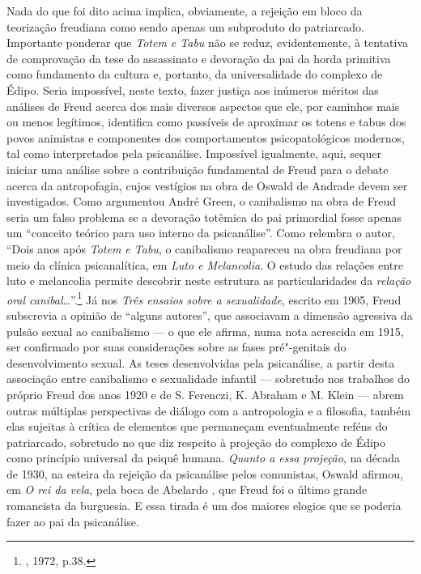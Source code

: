 Nada do que foi dito acima implica, obviamente, a rejeição em bloco da
teorização freudiana como sendo apenas um subproduto do patriarcado.
Importante ponderar que \emph{Totem e Tabu} não se reduz, evidentemente,
à tentativa de comprovação da tese do assassinato e devoração da pai da
horda primitiva como fundamento da cultura e, portanto, da
universalidade do complexo de Édipo. Seria impossível, neste texto,
fazer justiça aos inúmeros méritos das análises de Freud acerca dos mais
diversos aspectos que ele, por caminhos mais ou menos legítimos,
identifica como passíveis de aproximar os totens e tabus dos povos
animistas e componentes dos comportamentos psicopatológicos modernos,
tal como interpretados pela psicanálise. Impossível igualmente, aqui,
sequer iniciar uma análise sobre a contribuição fundamental de Freud
para o debate acerca da antropofagia, cujos vestígios na obra de Oswald
de Andrade devem ser investigados. Como argumentou André Green, o
canibalismo na obra de Freud seria um falso problema se a devoração
totêmica do pai primordial fosse apenas um ``conceito teórico para uso
interno da psicanálise''. Como relembra o autor, ``Dois anos após
\emph{Totem e Tabu}, o canibalismo reapareceu na obra freudiana por meio
da clínica psicanalítica, em \emph{Luto e Melancolia}. O estudo das
relações entre luto e melancolia permite descobrir neste estrutura as
particularidades da \emph{relação oral canibal}\ldots{}''.\footnote{,
  1972, p.38.} Já nos \emph{Três ensaios sobre a sexualidade}, escrito
em 1905, Freud subscrevia a opinião de ``alguns autores'', que
associavam a dimensão agressiva da pulsão sexual ao canibalismo --- o
que ele afirma, numa nota acrescida em 1915, ser confirmado por suas
considerações sobre as fases pré"-genitais do desenvolvimento sexual. As
teses desenvolvidas pela psicanálise, a partir desta associação entre
canibalismo e sexualidade infantil --- sobretudo nos trabalhos do próprio
Freud dos anos 1920 e de S. Ferenczi, K. Abraham e M. Klein --- abrem
outras múltiplas perspectivas de diálogo com a antropologia e a
filosofia, também elas sujeitas à crítica de elementos que permaneçam
eventualmente reféns do patriarcado, sobretudo no que diz respeito à
projeção do complexo de Édipo como princípio universal da psiquê humana.
\emph{Quanto a essa projeção}, na década de 1930, na esteira da rejeição
da psicanálise pelos comunistas, Oswald afirmou, em \emph{O rei da
vela}, pela boca de Abelardo , que Freud foi o último grande romancista
da burguesia. E essa tirada é um dos maiores elogios que se poderia
fazer ao pai da psicanálise.

